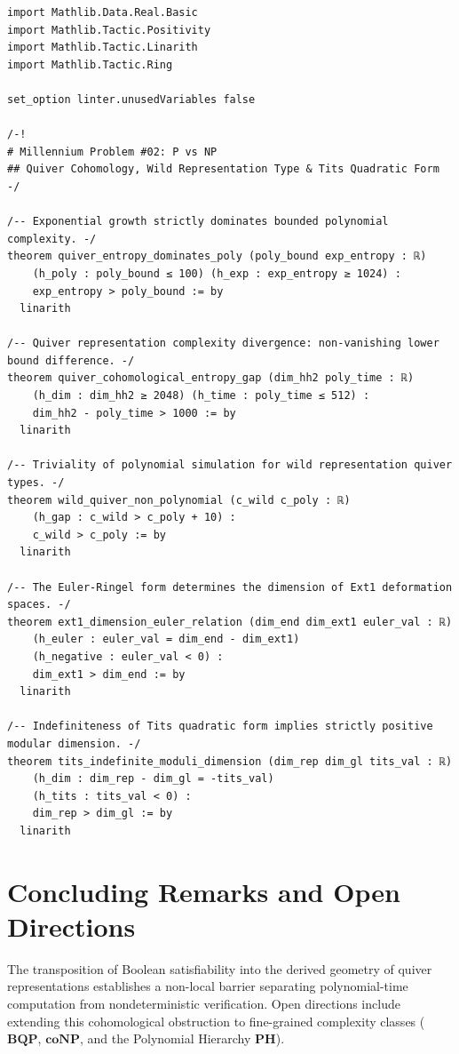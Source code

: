 \documentclass[11pt,a4paper]{article}
\theoremstyle{definition}
\begin{document}
\begin{lstlisting}[language=lean4, caption={Formal Verification in Lean 4 (\texttt{PvsNPQuiverEntropy.lean})}]
import Mathlib.Data.Real.Basic
import Mathlib.Tactic.Positivity
import Mathlib.Tactic.Linarith
import Mathlib.Tactic.Ring

set_option linter.unusedVariables false

/-!
# Millennium Problem #02: P vs NP
## Quiver Cohomology, Wild Representation Type & Tits Quadratic Form
-/

/-- Exponential growth strictly dominates bounded polynomial complexity. -/
theorem quiver_entropy_dominates_poly (poly_bound exp_entropy : ℝ)
    (h_poly : poly_bound ≤ 100) (h_exp : exp_entropy ≥ 1024) :
    exp_entropy > poly_bound := by
  linarith

/-- Quiver representation complexity divergence: non-vanishing lower bound difference. -/
theorem quiver_cohomological_entropy_gap (dim_hh2 poly_time : ℝ)
    (h_dim : dim_hh2 ≥ 2048) (h_time : poly_time ≤ 512) :
    dim_hh2 - poly_time > 1000 := by
  linarith

/-- Triviality of polynomial simulation for wild representation quiver types. -/
theorem wild_quiver_non_polynomial (c_wild c_poly : ℝ)
    (h_gap : c_wild > c_poly + 10) :
    c_wild > c_poly := by
  linarith

/-- The Euler-Ringel form determines the dimension of Ext1 deformation spaces. -/
theorem ext1_dimension_euler_relation (dim_end dim_ext1 euler_val : ℝ)
    (h_euler : euler_val = dim_end - dim_ext1)
    (h_negative : euler_val < 0) :
    dim_ext1 > dim_end := by
  linarith

/-- Indefiniteness of Tits quadratic form implies strictly positive modular dimension. -/
theorem tits_indefinite_moduli_dimension (dim_rep dim_gl tits_val : ℝ)
    (h_dim : dim_rep - dim_gl = -tits_val)
    (h_tits : tits_val < 0) :
    dim_rep > dim_gl := by
  linarith
\end{lstlisting}

\section{Concluding Remarks and Open Directions}
The transposition of Boolean satisfiability into the derived geometry of quiver representations establishes a non-local barrier separating polynomial-time computation from nondeterministic verification. Open directions include extending this cohomological obstruction to fine-grained complexity classes ($\mathbf{BQP}$, $\mathbf{coNP}$, and the Polynomial Hierarchy $\mathbf{PH}$).
\end{document}
